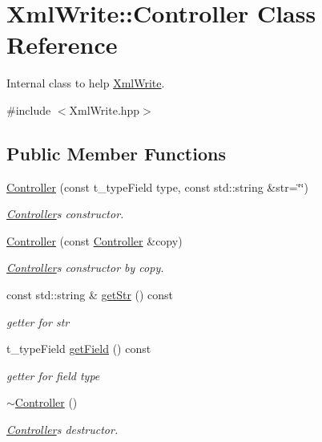 \hypertarget{class_xml_write_1_1_controller}{}\section{Xml\+Write\+:\+:Controller Class Reference}
\label{class_xml_write_1_1_controller}


Internal class to help \hyperlink{class_xml_write}{Xml\+Write}.  




{\ttfamily \#include $<$Xml\+Write.\+hpp$>$}

\subsection*{Public Member Functions}
\begin{DoxyCompactItemize}
\item 
\hyperlink{class_xml_write_1_1_controller_a2dbbed59623365f8c6b65cd4b7f13d42}{Controller} (const t\+\_\+type\+Field type, const std\+::string \&str=\char`\"{}\char`\"{})
\begin{DoxyCompactList}\small\item\em \hyperlink{class_xml_write_1_1_controller}{Controller}\textquotesingle{}s constructor. \end{DoxyCompactList}\item 
\hyperlink{class_xml_write_1_1_controller_aa579b1250c5a648fdd784e89a8442a91}{Controller} (const \hyperlink{class_xml_write_1_1_controller}{Controller} \&copy)
\begin{DoxyCompactList}\small\item\em \hyperlink{class_xml_write_1_1_controller}{Controller}\textquotesingle{}s constructor by copy. \end{DoxyCompactList}\item 
const std\+::string \& \hyperlink{class_xml_write_1_1_controller_a415152dd799823664984c416af639e6b}{get\+Str} () const 
\begin{DoxyCompactList}\small\item\em getter for str \end{DoxyCompactList}\item 
t\+\_\+type\+Field \hyperlink{class_xml_write_1_1_controller_a9218d54ac4522fe5a608e9e212995f7e}{get\+Field} () const 
\begin{DoxyCompactList}\small\item\em getter for field type \end{DoxyCompactList}\item 
\hypertarget{class_xml_write_1_1_controller_ade524d6e717fe2fa6970da1c4f549531}{}\hyperlink{class_xml_write_1_1_controller_ade524d6e717fe2fa6970da1c4f549531}{$\sim$\+Controller} ()\label{class_xml_write_1_1_controller_ade524d6e717fe2fa6970da1c4f549531}

\begin{DoxyCompactList}\small\item\em \hyperlink{class_xml_write_1_1_controller}{Controller}\textquotesingle{}s destructor. \end{DoxyCompactList}\end{DoxyCompactItemize}
